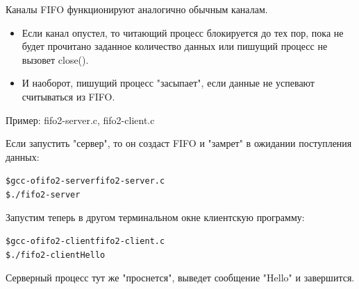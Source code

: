 \documentclass[xcolor=table]{beamer}
\begin{document}
\begin{frame}[fragile]
Каналы FIFO функционируют аналогично обычным каналам.
\begin{itemize}
\item Если канал опустел, то читающий процесс блокируется до тех пор, пока не будет прочитано заданное количество данных или пишущий процесс не вызовет close().
\item И наоборот, пишущий процесс "засыпает", если данные не успевают считываться из FIFO.
\end{itemize}
Пример: fifo2-server.c, fifo2-client.c 

Если запустить "сервер", то он создаст FIFO и "замрет" в ожидании поступления данных:
\begin{alltt}
\$ gcc -o fifo2-server fifo2-server.c
\$ ./fifo2-server
\end{alltt}
Запустим теперь в другом терминальном окне клиентскую программу:
\begin{alltt}
\$ gcc -o fifo2-client fifo2-client.c
\$ ./fifo2-client Hello
\end{alltt}
Серверный процесс тут же "проснется", выведет сообщение "Hello" и завершится.
\end{frame}
\end{document}
